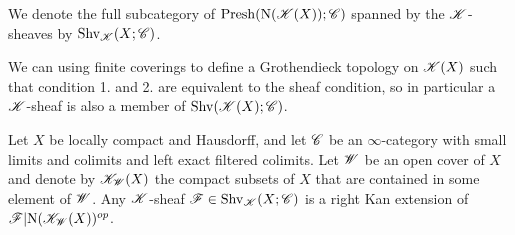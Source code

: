 \documentclass[../../thesis.tex]{subfiles}
\begin{document}
\begin{definition}
    We denote the full subcategory of $\mathrm{Presh}(\mathrm{N}(\mathscr{K}(X)); \mathscr{C})$ spanned by the $\mathscr{K}$-sheaves by $\mathrm{Shv}_{\mathscr{K}}(X;\mathscr{C})$.
\end{definition}
\begin{remark}
    We can using finite coverings to define a Grothendieck topology on $\mathscr{K}(X)$ such that condition 1. and 2. are equivalent to the sheaf condition, so in particular a $\mathscr{K}$-sheaf is also a member of $\mathrm{Shv}(\mathscr{K}(X); \mathscr{C})$.
\end{remark}
\begin{lemma}\label{7.3.4.8}
    Let $X$ be locally compact and Hausdorff, and let $\mathscr{C}$ be an $\infty$-category with small limits and colimits and left exact filtered colimits.
    Let $\mathscr{W}$ be an open cover of $X$ and denote by $\mathscr{K}_{\mathscr{W}}(X)$ the compact subsets of $X$ that are contained in some element of $\mathscr{W}$.
    Any $\mathscr{K}$-sheaf $\mathscr{F}\in \mathrm{Shv}_{\mathscr{K}}(X;\mathscr{C})$ is a right Kan extension of $\mathscr{F}|\mathrm{N}(\mathscr{K}_{\mathscr{W}}(X))^{op}$.
\end{lemma}
\end{document}
